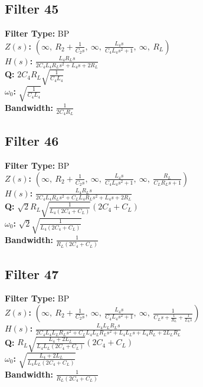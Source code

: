 \documentclass{article}
\begin{document}
\subsection*{Filter 45}
\textbf{Filter Type:} BP \\ 
\textbf{$Z(s)$:} $\left( \infty, \  R_{2} + \frac{1}{C_{2} s}, \  \infty, \  \frac{L_{4} s}{C_{4} L_{4} s^{2} + 1}, \  \infty, \  R_{L}\right)$ \\ 
\textbf{$H(s)$:} $\frac{L_{4} R_{L} s}{2 C_{4} L_{4} R_{L} s^{2} + L_{4} s + 2 R_{L}}$ \\ 
\textbf{Q:} $2 C_{4} R_{L} \sqrt{\frac{1}{C_{4} L_{4}}}$ \\ 
\textbf{$\omega_0$:} $\sqrt{\frac{1}{C_{4} L_{4}}}$ \\ 
\textbf{Bandwidth:} $\frac{1}{2 C_{4} R_{L}}$ \\ 
\subsection*{Filter 46}
\textbf{Filter Type:} BP \\ 
\textbf{$Z(s)$:} $\left( \infty, \  R_{2} + \frac{1}{C_{2} s}, \  \infty, \  \frac{L_{4} s}{C_{4} L_{4} s^{2} + 1}, \  \infty, \  \frac{R_{L}}{C_{L} R_{L} s + 1}\right)$ \\ 
\textbf{$H(s)$:} $\frac{L_{4} R_{L} s}{2 C_{4} L_{4} R_{L} s^{2} + C_{L} L_{4} R_{L} s^{2} + L_{4} s + 2 R_{L}}$ \\ 
\textbf{Q:} $\sqrt{2} R_{L} \sqrt{\frac{1}{L_{4} \left(2 C_{4} + C_{L}\right)}} \left(2 C_{4} + C_{L}\right)$ \\ 
\textbf{$\omega_0$:} $\sqrt{2} \sqrt{\frac{1}{L_{4} \left(2 C_{4} + C_{L}\right)}}$ \\ 
\textbf{Bandwidth:} $\frac{1}{R_{L} \left(2 C_{4} + C_{L}\right)}$ \\ 
\subsection*{Filter 47}
\textbf{Filter Type:} BP \\ 
\textbf{$Z(s)$:} $\left( \infty, \  R_{2} + \frac{1}{C_{2} s}, \  \infty, \  \frac{L_{4} s}{C_{4} L_{4} s^{2} + 1}, \  \infty, \  \frac{1}{C_{L} s + \frac{1}{R_{L}} + \frac{1}{L_{L} s}}\right)$ \\ 
\textbf{$H(s)$:} $\frac{L_{4} L_{L} R_{L} s}{2 C_{4} L_{4} L_{L} R_{L} s^{2} + C_{L} L_{4} L_{L} R_{L} s^{2} + L_{4} L_{L} s + L_{4} R_{L} + 2 L_{L} R_{L}}$ \\ 
\textbf{Q:} $R_{L} \sqrt{\frac{L_{4} + 2 L_{L}}{L_{4} L_{L} \left(2 C_{4} + C_{L}\right)}} \left(2 C_{4} + C_{L}\right)$ \\ 
\textbf{$\omega_0$:} $\sqrt{\frac{L_{4} + 2 L_{L}}{L_{4} L_{L} \left(2 C_{4} + C_{L}\right)}}$ \\ 
\textbf{Bandwidth:} $\frac{1}{R_{L} \left(2 C_{4} + C_{L}\right)}$ \\ 
\end{document}
